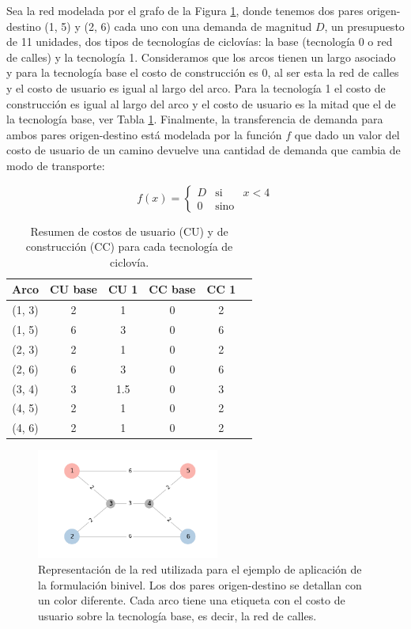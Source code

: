 \documentclass{article}
\begin{document}
  Sea la red modelada por el grafo de la Figura \ref{fig:example1base}, donde tenemos dos pares origen-destino (1, 5) y (2, 6) cada uno con una demanda de magnitud $D$, un presupuesto de 11 unidades, dos tipos de tecnologías de ciclovías: la base (tecnología 0 o red de calles) y la tecnología 1. Consideramos que los arcos tienen un largo asociado y para la tecnología base el costo de construcción es 0, al ser esta la red de calles y el costo de usuario es igual al largo del arco. Para la tecnología 1 el costo de construcción es igual al largo del arco y el costo de usuario es la mitad que el de la tecnología base, ver Tabla \ref{table:example1arccosts}. Finalmente, la transferencia de demanda para ambos pares origen-destino está modelada por la función $f$ que dado un valor del costo de usuario de un camino devuelve una cantidad de demanda que cambia de modo de transporte:

  $$
    f(x) = \left\{ \begin{array}{lcr}
            D & \mbox{si}   & x < 4 \\
            0 & \mbox{sino} &
    \end{array}
    \right.
  $$

  \begin{table}[h!]
    \centering
    \begin{tabular}{cccccc}
      \toprule
      Arco & CU base & CU 1 & CC base & CC 1 & \\
      \midrule
        (1, 3) & 2 & 1   & 0 & 2 \\
        (1, 5) & 6 & 3   & 0 & 6 \\
        (2, 3) & 2 & 1   & 0 & 2 \\
        (2, 6) & 6 & 3   & 0 & 6 \\
        (3, 4) & 3 & 1.5 & 0 & 3 \\
        (4, 5) & 2 & 1   & 0 & 2 \\
        (4, 6) & 2 & 1   & 0 & 2 \\
      \bottomrule
    \end{tabular}
      \caption{Resumen de costos de usuario (CU) y de construcción (CC) para cada tecnología de ciclovía.}\label{table:example1arccosts}
  \end{table}

  \begin{figure}[h!]
    \centering
    \includegraphics[width=6cm]{../resources/example_1_base.png}
    \caption{Representación de la red utilizada para el ejemplo de aplicación de la formulación binivel. Los dos pares origen-destino se detallan con un color diferente. Cada arco tiene una etiqueta con el costo de usuario sobre la tecnología base, es decir, la red de calles.}
    \label{fig:example1base}
  \end{figure}
\end{document}
